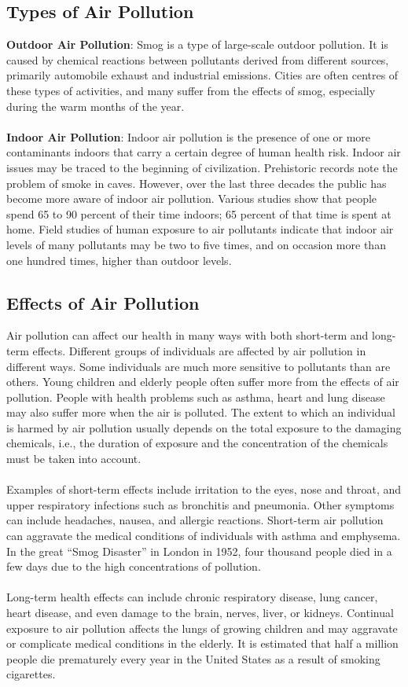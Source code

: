 \subsection{Types of Air Pollution}
\textbf{Outdoor Air Pollution}:
Smog is a type of large-scale outdoor pollution. It is caused by chemical reactions between pollutants derived from different sources, primarily automobile exhaust and industrial emissions. Cities are often centres of these types of activities, and many suffer from the effects of smog, especially during the warm months of the year.
\\
\\
\textbf{Indoor Air Pollution}:
Indoor air pollution is the presence of one or more contaminants indoors that carry a certain degree of human health risk. Indoor air issues may be traced to the beginning of civilization. Prehistoric records note the problem of smoke in caves. However, over the last three decades the public has become more aware of indoor air pollution. Various studies show that people spend 65 to 90 percent of their time indoors; 65 percent of that time is spent at home. Field studies of human exposure to air pollutants indicate that indoor air levels of many pollutants may be two to five times, and on occasion more than one hundred times, higher than outdoor levels.

\subsection{Effects of Air Pollution}
Air pollution can affect our health in many ways with both short-term and long-term effects. Different groups of individuals are affected by air pollution in different ways. Some individuals are much more sensitive to pollutants than are others. Young children and elderly people often suffer more from the effects of air pollution. People with health problems such as asthma, heart and lung disease may also suffer more when the air is polluted. The extent to which an individual is harmed by air pollution usually depends on the total exposure to the damaging chemicals, i.e., the duration of exposure and the concentration of the chemicals must be taken into account.
\\
\\
Examples of short-term effects include irritation to the eyes, nose and throat, and upper respiratory infections such as bronchitis and pneumonia. Other symptoms can include headaches, nausea, and allergic reactions. Short-term air pollution can aggravate the medical conditions of individuals with asthma and emphysema. In the great “Smog Disaster” in London in 1952, four thousand people died in a few days due to the high concentrations of pollution.
\\
\\
Long-term health effects can include chronic respiratory disease, lung cancer, heart disease, and even damage to the brain, nerves, liver, or kidneys. Continual exposure to air pollution affects the lungs of growing children and may aggravate or complicate medical conditions in the elderly. It is estimated that half a million people die prematurely every year in the United States as a result of smoking cigarettes.


